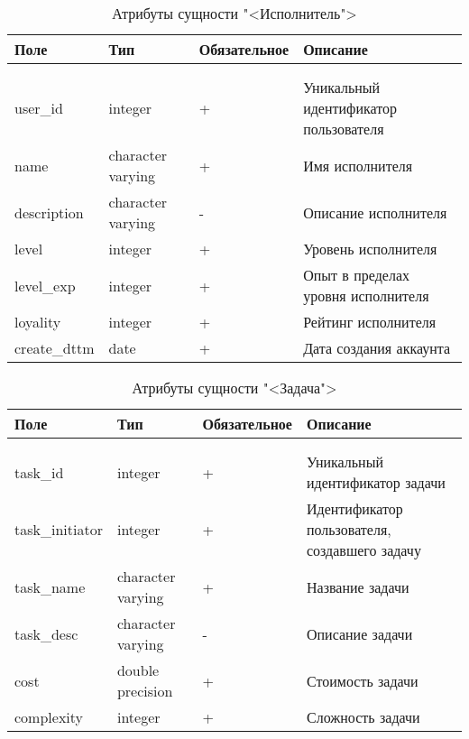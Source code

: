 \begin{xltabular}{\textwidth}{|l|l|p{1.7cm}|X|}
	\caption{Атрибуты сущности "<Исполнитель">\label{executor:table}}\\ \hline
	\centrow Поле & \centrow Тип & \centrow Обяза\-тельное & \centrow Описание \\ \hline
	 &  &  &  \\ \hline
	\endfirsthead
	 &  &  &  \\ \hline
	\finishhead
	user\_id & integer & + & Уникальный идентификатор пользователя \\ \hline 
	name & character varying & + & Имя исполнителя \\ \hline 
	description & character varying & - & Описание исполнителя \\ \hline
	level & integer & + & Уровень исполнителя \\ \hline  
	level\_exp & integer & + & Опыт в пределах уровня исполнителя \\ \hline  
	loyality & integer & + & Рейтинг исполнителя \\ \hline  
	create\_dttm & date & + & Дата создания аккаунта 
\end{xltabular}

\begin{xltabular}{\textwidth}{|l|l|p{1.7cm}|X|}
	\caption{Атрибуты сущности "<Задача">\label{task:table}}\\ \hline
	\centrow Поле & \centrow Тип & \centrow Обяза\-тельное & \centrow Описание \\ \hline
	 &  &  &  \\ \hline
	\endfirsthead
	 &  &  &  \\ \hline
	\finishhead
	task\_id & integer & + & Уникальный идентификатор задачи \\ \hline 
	task\_initiator & integer & + & Идентификатор пользователя, создавшего задачу \\ \hline 
	task\_name & character varying & + & Название задачи \\ \hline 
	task\_desc & character varying & - & Описание задачи \\ \hline 
	cost & double precision & + & Стоимость задачи \\ \hline  
	complexity & integer & + & Сложность задачи 
\end{xltabular}


